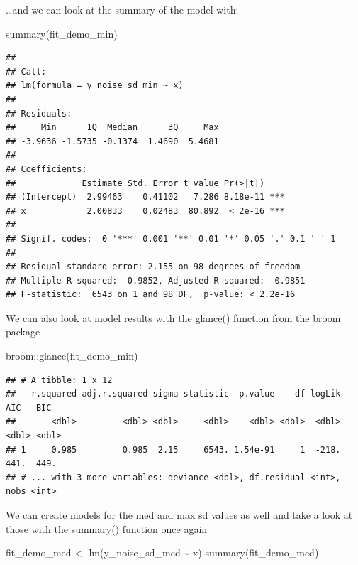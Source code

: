 \documentclass[
]{book}
\newenvironment{Shaded}{\begin{snugshade}}{\end{snugshade}}
\newcommand{\FunctionTok}[1]{\textcolor[rgb]{0.00,0.00,0.00}{#1}}
\newcommand{\NormalTok}[1]{#1}
\newcommand{\OtherTok}[1]{\textcolor[rgb]{0.56,0.35,0.01}{#1}}
\newcommand{\SpecialCharTok}[1]{\textcolor[rgb]{0.00,0.00,0.00}{#1}}
\begin{document}
\ldots and we can look at the summary of the model with:

\begin{Shaded}
\begin{Highlighting}[]
\FunctionTok{summary}\NormalTok{(fit\_demo\_min)}
\end{Highlighting}
\end{Shaded}

\begin{verbatim}
## 
## Call:
## lm(formula = y_noise_sd_min ~ x)
## 
## Residuals:
##     Min      1Q  Median      3Q     Max 
## -3.9636 -1.5735 -0.1374  1.4690  5.4681 
## 
## Coefficients:
##             Estimate Std. Error t value Pr(>|t|)    
## (Intercept)  2.99463    0.41102   7.286 8.18e-11 ***
## x            2.00833    0.02483  80.892  < 2e-16 ***
## ---
## Signif. codes:  0 '***' 0.001 '**' 0.01 '*' 0.05 '.' 0.1 ' ' 1
## 
## Residual standard error: 2.155 on 98 degrees of freedom
## Multiple R-squared:  0.9852, Adjusted R-squared:  0.9851 
## F-statistic:  6543 on 1 and 98 DF,  p-value: < 2.2e-16
\end{verbatim}

We can also look at model results with the glance() function from the broom package

\begin{Shaded}
\begin{Highlighting}[]
\NormalTok{broom}\SpecialCharTok{::}\FunctionTok{glance}\NormalTok{(fit\_demo\_min)}
\end{Highlighting}
\end{Shaded}

\begin{verbatim}
## # A tibble: 1 x 12
##   r.squared adj.r.squared sigma statistic  p.value    df logLik   AIC   BIC
##       <dbl>         <dbl> <dbl>     <dbl>    <dbl> <dbl>  <dbl> <dbl> <dbl>
## 1     0.985         0.985  2.15     6543. 1.54e-91     1  -218.  441.  449.
## # ... with 3 more variables: deviance <dbl>, df.residual <int>, nobs <int>
\end{verbatim}

We can create models for the med and max sd values as well and take a look at those with the summary() function once again

\begin{Shaded}
\begin{Highlighting}[]
\NormalTok{fit\_demo\_med }\OtherTok{\textless{}{-}} \FunctionTok{lm}\NormalTok{(y\_noise\_sd\_med }\SpecialCharTok{\textasciitilde{}}\NormalTok{ x)}
\FunctionTok{summary}\NormalTok{(fit\_demo\_med)}
\end{Highlighting}
\end{Shaded}
\end{document}

